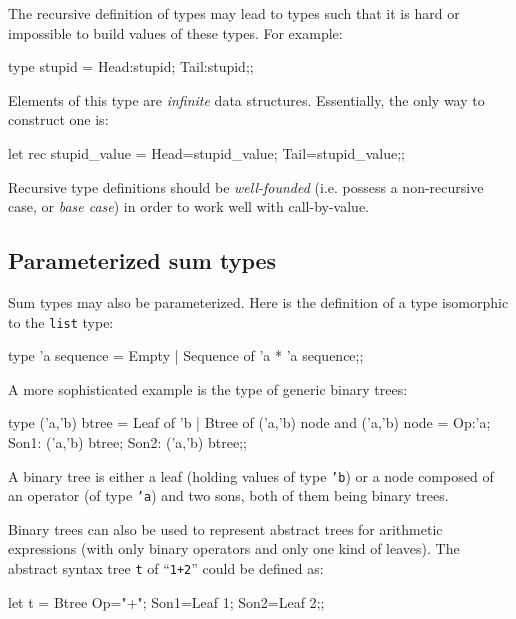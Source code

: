The recursive definition of types may lead to types such that it is
hard or impossible to build values of these types.
For example:
\begin{caml_example}
type stupid = {Head:stupid; Tail:stupid};;
\end{caml_example}
Elements of this type are {\em infinite} data structures. Essentially,
the only way to construct one is:
\begin{caml_example}
let rec stupid_value =
    {Head=stupid_value; Tail=stupid_value};;
\end{caml_example}

Recursive type definitions should be {\em well-founded} (i.e. possess
a non-recursive case, or {\em base case}) in order to work well with
call-by-value.

\subsection{Parameterized sum types}

Sum types may also be parameterized.
Here is the definition of a type isomorphic to the {\tt list} type:
\begin{caml_example}
type 'a sequence = Empty
                 | Sequence of 'a * 'a sequence;;
\end{caml_example}

A more sophisticated example is the type of generic binary trees:
\begin{caml_example}
type ('a,'b) btree = Leaf of 'b
                   | Btree of ('a,'b) node
and ('a,'b) node = {Op:'a;
                    Son1: ('a,'b) btree;
                    Son2: ('a,'b) btree};;
\end{caml_example}
A binary tree is either a leaf (holding values of type {\tt 'b}) or a
node composed of an operator (of type {\tt 'a}) and two sons, both of them
being binary trees.

Binary trees can also be used to represent abstract trees for
arithmetic expressions (with only binary operators and only one kind
of leaves). The abstract
syntax tree \verb|t| of ``\verb|1+2|'' could be defined as:
\begin{caml_example}
let t = Btree {Op="+"; Son1=Leaf 1; Son2=Leaf 2};;
\end{caml_example}

